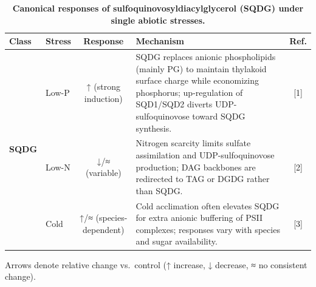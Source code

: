 \documentclass[10pt,letterpaper]{article}
\begin{document}
\begin{table}[!ht]
  \centering
  \caption{\bf Canonical responses of sulfoquinovosyldiacylglycerol (SQDG) under single abiotic stresses.}
  \label{table:SQDG_responses}
  \begin{tabular}{@{} l l c p{6cm} c @{}}
    \toprule
    \textbf{Class} 
      & \textbf{Stress} 
      & \textbf{Response} 
      & \textbf{Mechanism} 
      & \textbf{Ref.} \\
    \midrule
    \multirow{3}{*}{\textbf{SQDG}}
      & Low-P  & ↑ (strong induction)   
               & SQDG replaces anionic phospholipids (mainly PG) to maintain thylakoid surface charge while economizing phosphorus; up-regulation of SQD1/SQD2 diverts UDP-sulfoquinovose toward SQDG synthesis. 
               & [1] \\
      & Low-N  & ↓/≈ (variable)         
               & Nitrogen scarcity limits sulfate assimilation and UDP-sulfoquinovose production; DAG backbones are redirected to TAG or DGDG rather than SQDG. 
               & [2] \\
      & Cold   & ↑/≈ (species-dependent)
               & Cold acclimation often elevates SQDG for extra anionic buffering of PSII complexes; responses vary with species and sugar availability. 
               & [3] \\
    \bottomrule
  \end{tabular}
  \begin{flushleft}
    {\footnotesize Arrows denote relative change vs.\ control (↑ increase, ↓ decrease, ≈ no consistent change).}
  \end{flushleft}
\end{table}
\end{document}
